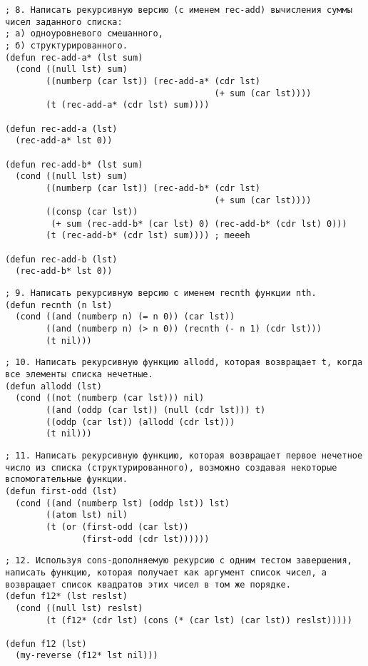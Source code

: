\documentclass[a4paper,oneside,14pt]{extarticle}
\begin{document}
\begin{lstlisting}
; 8. Написать рекурсивную версию (с именем rec-add) вычисления суммы чисел заданного списка:
; а) одноуровневого смешанного,
; б) структурированного.
(defun rec-add-a* (lst sum)
  (cond ((null lst) sum)
        ((numberp (car lst)) (rec-add-a* (cdr lst)
                                         (+ sum (car lst))))
        (t (rec-add-a* (cdr lst) sum))))

(defun rec-add-a (lst)
  (rec-add-a* lst 0))

(defun rec-add-b* (lst sum)
  (cond ((null lst) sum)
        ((numberp (car lst)) (rec-add-b* (cdr lst)
                                         (+ sum (car lst))))
        ((consp (car lst))
         (+ sum (rec-add-b* (car lst) 0) (rec-add-b* (cdr lst) 0)))
        (t (rec-add-b* (cdr lst) sum)))) ; meeeh

(defun rec-add-b (lst)
  (rec-add-b* lst 0))
\end{lstlisting}

\begin{lstlisting}
; 9. Написать рекурсивную версию с именем recnth функции nth.
(defun recnth (n lst)
  (cond ((and (numberp n) (= n 0)) (car lst))
        ((and (numberp n) (> n 0)) (recnth (- n 1) (cdr lst)))
        (t nil)))
\end{lstlisting}

\begin{lstlisting}
; 10. Написать рекурсивную функцию allodd, которая возвращает t, когда все элементы списка нечетные.
(defun allodd (lst)
  (cond ((not (numberp (car lst))) nil)
        ((and (oddp (car lst)) (null (cdr lst))) t)
        ((oddp (car lst)) (allodd (cdr lst)))
        (t nil)))
\end{lstlisting}

\begin{lstlisting}
; 11. Написать рекурсивную функцию, которая возвращает первое нечетное число из списка (структурированного), возможно создавая некоторые вспомогательные функции.
(defun first-odd (lst)
  (cond ((and (numberp lst) (oddp lst)) lst)
        ((atom lst) nil)
        (t (or (first-odd (car lst))
               (first-odd (cdr lst))))))
\end{lstlisting}

\begin{lstlisting}
; 12. Используя cons-дополняемую рекурсию с одним тестом завершения, написать функцию, которая получает как аргумент список чисел, а возвращает список квадратов этих чисел в том же порядке.
(defun f12* (lst reslst)
  (cond ((null lst) reslst)
        (t (f12* (cdr lst) (cons (* (car lst) (car lst)) reslst)))))

(defun f12 (lst)
  (my-reverse (f12* lst nil)))
\end{lstlisting}

\end{document}

